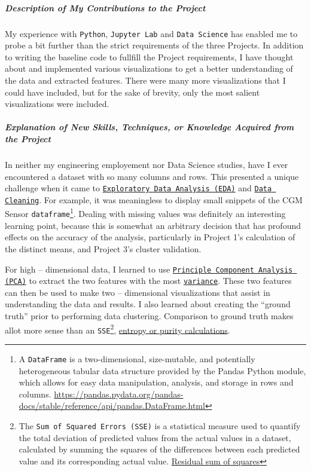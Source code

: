 \subparagraph{Description of My Contributions to the Project}

My experience with \texttt{Python}, \texttt{Jupyter Lab} and \texttt{Data Science} has enabled me to probe a bit further than the strict requirements of the three Projects.  In addition to writing the baseline code to fullfill the Project requirements, I have thought about and implemented various visualizations to get a better understanding of the data and extracted features.  There were many more visualizations that I could have included, but for the sake of brevity, only the most salient visualizations were included.

\subparagraph{Explanation of New Skills, Techniques, or Knowledge Acquired from the Project}

In neither my engineering employement nor Data Science studies, have I ever encountered a dataset with so many columns and rows.  This presented a unique challenge when it came to \href{https://grokipedia.com/page/Exploratory\_data\_analysis}{\texttt{Exploratory Data Analysis (EDA)}} and \href{https://grokipedia.com/page/Data\_cleansing}{\texttt{Data Cleaning}}.  For example, it was meaningless to display small snippets of the CGM Sensor \texttt{dataframe}\footnote{A \texttt{DataFrame} is a two-dimensional, size-mutable, and potentially heterogeneous tabular data structure provided by the Pandas Python module, which allows for easy data manipulation, analysis, and storage in rows and columns. \href{https://pandas.pydata.org/pandas-docs/stable/reference/api/pandas.DataFrame.html}{https://pandas.pydata.org/pandas-docs/stable/reference/api/pandas.DataFrame.html}}.  Dealing with missing values was definitely an interesting learning point, because this is somewhat an arbitrary decision that has profound effects on the accuracy of the analysis, particularly in Project 1's calculation of the distinct means, and Project 3's cluster validation.

For high -- dimensional data, I learned to use \href{https://grokipedia.com/page/Principal\_component\_analysis}{\texttt{Principle Component Analysis (PCA)}} to extract the two features with the most \href{https://grokipedia.com/page/Variance}{\texttt{variance}}.  These two features can then be used to make two -- dimensional visualizations that assist in understanding the data and results.  I also learned about creating the ``ground truth'' prior to performing data clustering.  Comparison to ground truth makes allot more sense than an \texttt{SSE}\footnote{The \texttt{Sum of Squared Errors (SSE)} is a statistical measure used to quantify the total deviation of predicted values from the actual values in a dataset, calculated by summing the squares of the differences between each predicted value and its corresponding actual value. \href{https://en.wikipedia.org/wiki/Residual\_sum\_of\_squares}{Residual sum of squares}}, \href{https://towardsdatascience.com/evaluation-metrics-for-clustering-models-5dde821dd6cd/}{entropy or purity calculations}.